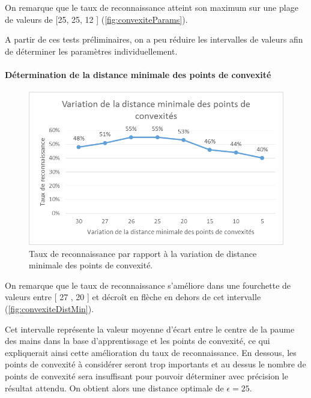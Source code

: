 On remarque que le taux de reconnaissance atteint son maximum sur une plage de valeurs de [25, 25, 12 ] (\autoref{fig:convexiteParams}). 

A partir de ces tests préliminaires, on a peu réduire les intervalles de valeurs afin de déterminer les paramètres individuellement.

\paragraph{Détermination de la distance minimale des points de convexité}

\begin{figure}[htb!]
\centerline{\includegraphics{convexiteDistMin.png}}
\caption{Taux de reconnaissance par rapport à la variation de distance minimale des points de convexité.}
\label{fig:convexiteDistMin}
\end{figure}

On remarque que le taux de reconnaissance s’améliore dans une fourchette de valeurs entre [ 27 , 20 ] et décroît en flèche en dehors de cet intervalle (\autoref{fig:convexiteDistMin}).

Cet intervalle représente la valeur moyenne d’écart entre le centre de la paume des mains dans la base d’apprentissage et les points de convexité, ce qui expliquerait ainsi cette amélioration du taux de reconnaissance. En dessous, les points de convexité à considérer seront trop importants et au dessus le nombre de points de convexité sera insuffisant pour pouvoir déterminer avec précision le résultat attendu.
On obtient alors une distance optimale de $\epsilon = 25$.

